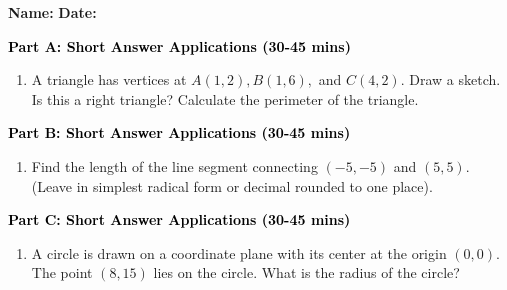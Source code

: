 \documentclass[12pt, letterpaper, fleqn]{article}
\begin{document}
\textbf{Name:} \underline{\hspace{5cm}}
\hfill
\textbf{Date:} \underline{\hspace{3cm}}\\


\begin{tcolorbox}[colback=customteal!20]
\large\textcolor{black}{\textbf{Part A: Short Answer Applications (30-45 mins)}}
\end{tcolorbox}

\vspace{3mm}

\begin{enumerate}[itemsep=4.2cm, leftmargin=0.6cm]
\item A triangle has vertices at $A(1, 2), B(1, 6),$ and $C(4, 2)$. Draw a sketch. Is this a right triangle? Calculate the perimeter of the triangle.
\end{enumerate}

\newpage

\begin{tcolorbox}[colback=customteal!20]
\large\textcolor{black}{\textbf{Part B: Short Answer Applications (30-45 mins)}}
\end{tcolorbox}

\vspace{3mm}

\begin{enumerate}[itemsep=4.2cm, leftmargin=0.6cm, resume]
\item Find the length of the line segment connecting $(-5, -5)$ and $(5, 5)$. (Leave in simplest radical form or decimal rounded to one place).
\end{enumerate}

\newpage

\begin{tcolorbox}[colback=customteal!20]
\large\textcolor{black}{\textbf{Part C: Short Answer Applications (30-45 mins)}}
\end{tcolorbox}

\vspace{3mm}

\begin{enumerate}[itemsep=4.2cm, leftmargin=0.6cm, resume]
\item A circle is drawn on a coordinate plane with its center at the origin $(0,0)$. The point $(8, 15)$ lies on the circle. What is the radius of the circle?
\end{enumerate}
\end{document}
